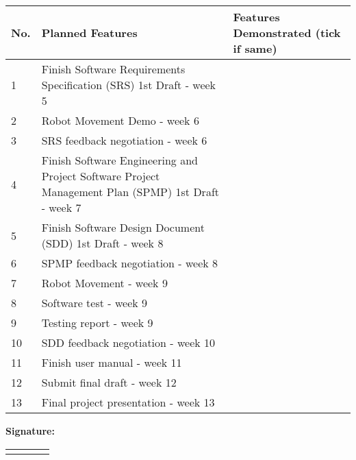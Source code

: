 \documentclass[a4paper] {article}
\begin{document}
         \begin{table} 
         \begin{tabular} 	
	         {|m{0.7cm}|m{12.6cm}|m{2.7cm}|}
	         \hline
	         \textbf{No.} & \textbf{Planned Features} & \textbf{Features Demonstrated (tick if same)}\\
	         \hline
	         1 & Finish Software Requirements Specification (SRS) 1st Draft - week 5 & \\ [3.5ex]
	         \hline
	         2 & Robot Movement Demo - week 6 & \\[3.5ex]
	         \hline
	         3 & SRS feedback negotiation - week 6 & \\[3.5ex]
	         \hline
	         4 & Finish Software Engineering and Project Software Project Management Plan (SPMP) 1st Draft - week 7 & \\[3.5ex]
	         \hline
	         5 & Finish Software Design Document (SDD) 1st Draft - week 8 & \\[3.5ex]
	         \hline
	         6 & SPMP feedback negotiation - week 8& \\[3.5ex]
	         \hline
	         7 & Robot Movement - week 9 & \\[3.5ex]
	         \hline
	         8 & Software test - week 9 & \\[3.5ex]
	         \hline
	         9 & Testing report - week 9 & \\[3.5ex]
	         \hline
	         10 & SDD feedback negotiation - week 10 & \\[3.5ex]
	         \hline
	         11 & Finish user manual - week 11 & \\[3.5ex]
	         \hline
	         12 & Submit final draft - week 12 & \\[3.5ex]
	         \hline
	         13 & Final project presentation - week 13 & \\[3.5ex]
	         \hline
         \end{tabular}

         \vspace{1cm}
         \textbf{Signature:}\\
         \begin{tabular} 
	          {|p{3.9cm}|p{3.9cm}|p{3.9cm}|p{3.9cm}|}
	         \hline
	          &  & & \\ [3.5ex]
	         \hline
	         & & & \\ [3.5ex]
	         \hline
         \end{tabular}
         \end{table}
	


	
\end{document}
